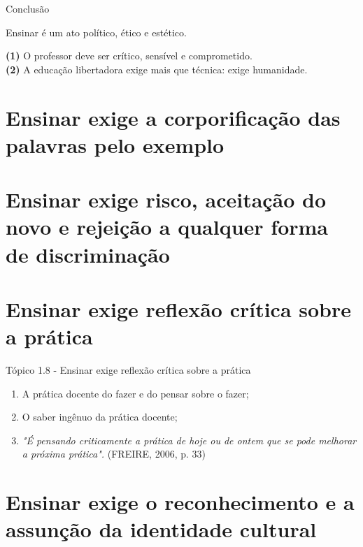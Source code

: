 \documentclass[12pt]{beamer}
\begin{document}
	\begin{frame}{Conclusão}
		
		\begin{alertblock}{\justifying Ensinar é um ato político, ético e estético.}
			
			\justifying
			\textbf{(1)} O professor deve ser crítico, sensível e comprometido. \\
			\textbf{(2)} A educação libertadora exige mais que técnica: exige humanidade.\\
	
		\end{alertblock}
		
	\end{frame}
\section{Ensinar exige a corporificação das palavras pelo exemplo}
\section{Ensinar exige risco, aceitação do novo e rejeição a qualquer forma de discriminação}
\section{Ensinar exige reflexão crítica sobre a prática}

	\begin{frame}{Tópico 1.8 - Ensinar exige reflexão crítica sobre a prática}
		\begin{enumerate}
			\justifying
			\item A prática docente do fazer e do pensar sobre o fazer; \\
			\item O saber ingênuo da prática docente; \\
			\item \textit{"É pensando criticamente a prática de hoje ou de ontem que se pode melhorar a próxima prática".} (FREIRE, 2006, p. 33)
		\end{enumerate}
	\end{frame}
	
\section{Ensinar exige o reconhecimento e a assunção da identidade cultural}
\end{document}
